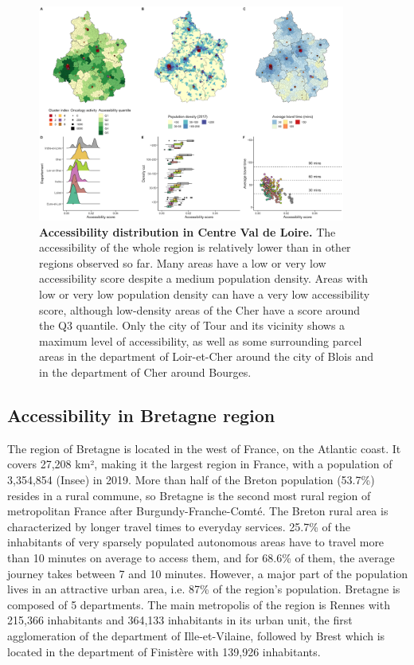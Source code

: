 \begin{figure}[H]
    \includegraphics[width=0.9\textwidth]{images/camion/region_accessibility/accessibility_Centre-Val-de-Loire.png}
    \centering
    \caption{ \textbf{Accessibility distribution in Centre Val de Loire.} The
        accessibility of the whole region is relatively lower than in other
        regions observed so far. Many areas have a low or very low accessibility
        score despite a medium population density. Areas with low or very low
        population density can have a very low accessibility score, although
        low-density areas of the Cher have a score around the Q3 quantile. Only
        the city of Tour and its vicinity shows a maximum level of
        accessibility, as well as some surrounding parcel areas in the
        department of Loir-et-Cher around the city of Blois and in the
        department of Cher around Bourges. }
\end{figure}

\subsection*{Accessibility in Bretagne region}

The region of Bretagne is located in the west of France, on the Atlantic coast.
It covers 27,208 km², making it the largest region in France, with a population
of 3,354,854 (Insee) in 2019. More than half of the Breton population (53.7\%)
resides in a rural commune, so Bretagne is the second most rural region of
metropolitan France after Burgundy-Franche-Comté. The Breton rural area is
characterized by longer travel times to everyday services. 25.7\% of the
inhabitants of very sparsely populated autonomous areas have to travel more than
10 minutes on average to access them, and for 68.6\% of them, the average
journey takes between 7 and 10 minutes. However, a major part of the population
lives in an attractive urban area, i.e. 87\% of the region's population.
Bretagne is composed of 5 departments. The main metropolis of the region is
Rennes with 215,366 inhabitants and 364,133 inhabitants in its urban unit, the
first agglomeration of the department of Ille-et-Vilaine, followed by Brest
which is located in the department of Finistère with 139,926 inhabitants.

